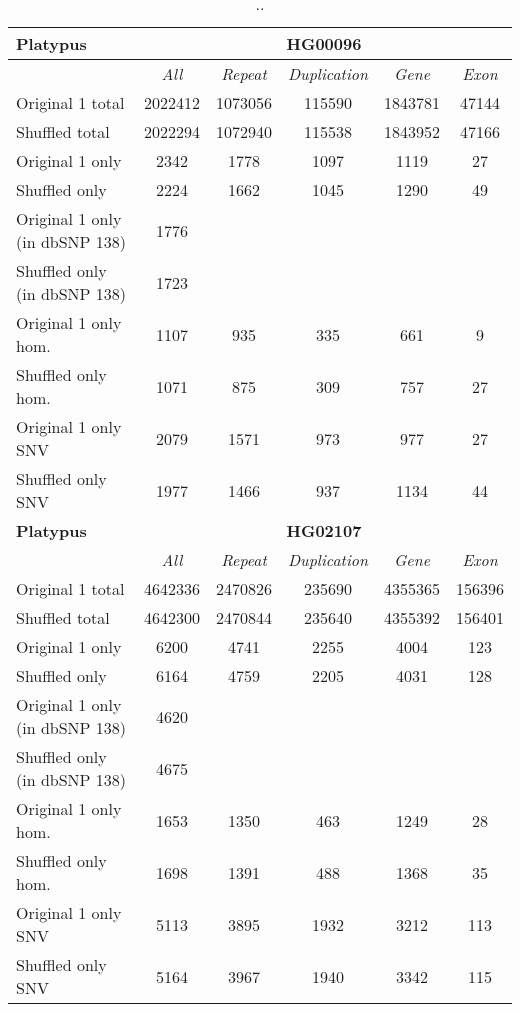 \clearpage

\begin{table}[htb]
\begin{center}
\begin{tabular}{|l|c||c|c|c|c|}
\hline
{\bf Platypus} & \multicolumn{5}{|c|}{\bf HG00096} \\
\hline
\cline{2-6}
{\bf} & {\it All} & {\it Repeat} & {\it Duplication} & {\it Gene} & {\it Exon} \\
\hline
Original 1 total & 2022412 & 1073056 & 115590 & 1843781 & 47144\\ 
\hline
Shuffled total & 2022294 & 1072940 & 115538 & 1843952 & 47166\\ 
\hline
Original 1 only & 2342 & 1778 & 1097 & 1119 & 27\\ 
\hline
Shuffled only & 2224 & 1662 & 1045 & 1290 & 49\\ 
\hline
Original 1 only (in dbSNP 138) & 1776 &  &  &  & \\ 
\hline
Shuffled only (in dbSNP 138) & 1723 &  &  &  & \\ 
\hline
Original 1 only hom. & 1107 & 935 & 335 & 661 & 9\\ 
\hline
Shuffled only hom. & 1071 & 875 & 309 & 757 & 27\\ 
\hline
Original 1 only SNV & 2079 & 1571 & 973 & 977 & 27\\ 
\hline
Shuffled only SNV & 1977 & 1466 & 937 & 1134 & 44\\ 
\hline
\hline
{\bf Platypus} & \multicolumn{5}{|c|}{\bf HG02107} \\
\hline
\cline{2-6}
{\bf} & {\it All} & {\it Repeat} & {\it Duplication} & {\it Gene} & {\it Exon} \\
\hline
Original 1 total & 4642336 & 2470826 & 235690 & 4355365 & 156396\\ 
\hline
Shuffled total & 4642300 & 2470844 & 235640 & 4355392 & 156401\\ 
\hline
Original 1 only & 6200 & 4741 & 2255 & 4004 & 123\\ 
\hline
Shuffled only & 6164 & 4759 & 2205 & 4031 & 128\\ 
\hline
Original 1 only (in dbSNP 138) & 4620 &  &  &  & \\ 
\hline
Shuffled only (in dbSNP 138) & 4675 &  &  &  & \\ 
\hline
Original 1 only hom. & 1653 & 1350 & 463 & 1249 & 28\\ 
\hline
Shuffled only hom. & 1698 & 1391 & 488 & 1368 & 35\\ 
\hline
Original 1 only SNV & 5113 & 3895 & 1932 & 3212 & 113\\ 
\hline
Shuffled only SNV & 5164 & 3967 & 1940 & 3342 & 115\\ 
\hline
\end{tabular}
\end{center}
\caption{ .. }
\label{tab:orig-vs-shuf-platypus}
\end{table}

